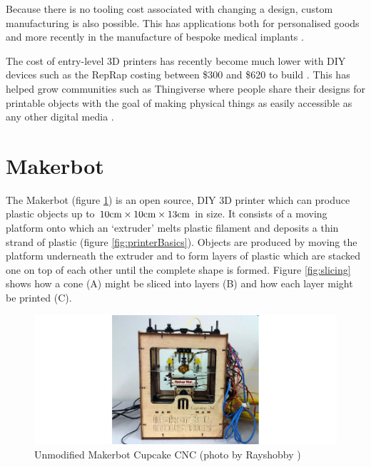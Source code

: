 		Because there is no tooling cost associated with changing a design, custom
		manufacturing is also possible. This has applications both for personalised
		goods and more recently in the manufacture of bespoke medical implants
		\cite{jaw}.
		
		The cost of entry-level 3D printers has recently become much lower with DIY
		devices such as the RepRap costing between \$300 and \$620 to build
		\cite{costsdown,reprap}. This has helped grow communities such as
		Thingiverse where people share their designs for printable objects with the
		goal of making physical things as easily accessible as any other digital
		media \cite{thingiverse}.
	
	\section{Makerbot}
		
		\label{sec:makerbot_basics}
		
		The Makerbot (figure \ref{fig:makerbotOrig}) is an open source, DIY 3D
		printer which can produce plastic objects up to
		$10\textrm{cm}\times10\textrm{cm}\times13\textrm{cm}$ in size.  It consists of a moving platform
		onto which an `extruder' melts plastic filament and deposits a thin strand
		of plastic (figure \ref{fig:printerBasics}). Objects are produced by moving
		the platform underneath the extruder and to form layers of plastic which are
		stacked one on top of each other until the complete shape is formed. Figure
		\ref{fig:slicing} shows how a cone (A) might be sliced into layers (B) and
		how each layer might be printed (C).
	
		\begin{figure}
			\includegraphics[width=1\textwidth]{diagrams/makerbotOrig.pdf}
			\caption{Unmodified Makerbot Cupcake CNC (photo by Rayshobby
			         \cite{rayshobby})}
			\label{fig:makerbotOrig}
		\end{figure}
	

